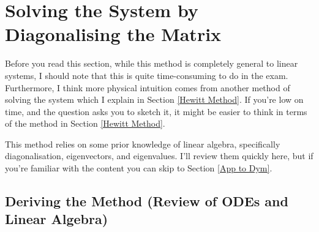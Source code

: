 \section{Solving the System by Diagonalising the Matrix}

Before you read this section, while this method is completely general to linear systems, I should note that this is quite time-consuming to do in the exam. Furthermore, I think more physical intuition comes from another method of solving the system which I explain in Section \ref{Hewitt Method}. If you're low on time, and the question asks you to sketch it, it might be easier to think in terms of the method in Section \ref{Hewitt Method}.

This method relies on some prior knowledge of linear algebra, specifically diagonalisation, eigenvectors, and eigenvalues. I'll review them quickly here, but if you're familiar with the content you can skip to Section \ref{App to Dym}. 

\subsection{Deriving the Method (Review of ODEs and Linear Algebra)}
